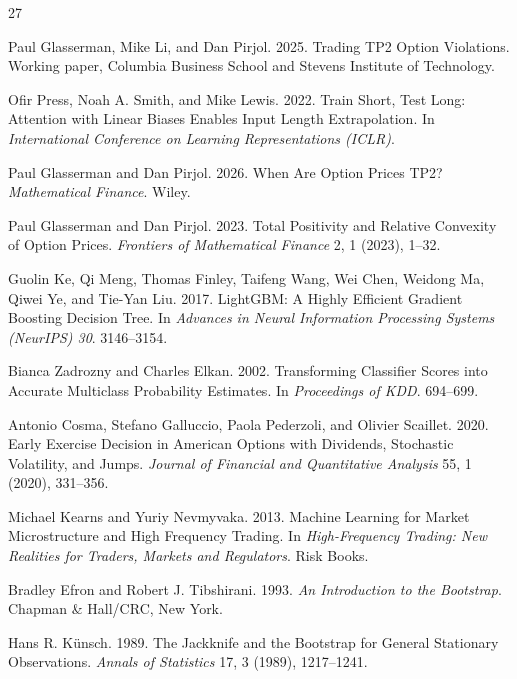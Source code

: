 \documentclass[sigconf,review]{acmart}
\begin{document}

\begingroup
\footnotesize
\setlength{\itemsep}{0pt}
\setlength{\parskip}{0pt}
\begin{thebibliography}{27}

Paul Glasserman, Mike Li, and Dan Pirjol. 2025. Trading TP2 Option Violations. Working paper, Columbia Business School and Stevens Institute of Technology.

Ofir Press, Noah A. Smith, and Mike Lewis. 2022. Train Short, Test Long: Attention with Linear Biases Enables Input Length Extrapolation. In \textit{International Conference on Learning Representations (ICLR)}.

Paul Glasserman and Dan Pirjol. 2026. When Are Option Prices TP2? \textit{Mathematical Finance}. Wiley.

Paul Glasserman and Dan Pirjol. 2023. Total Positivity and Relative Convexity of Option Prices. \textit{Frontiers of Mathematical Finance} 2, 1 (2023), 1--32.

Guolin Ke, Qi Meng, Thomas Finley, Taifeng Wang, Wei Chen, Weidong Ma, Qiwei Ye, and Tie-Yan Liu. 2017. LightGBM: A Highly Efficient Gradient Boosting Decision Tree. In \textit{Advances in Neural Information Processing Systems (NeurIPS) 30}. 3146--3154.

Bianca Zadrozny and Charles Elkan. 2002. Transforming Classifier Scores into Accurate Multiclass Probability Estimates. In \textit{Proceedings of KDD}. 694--699.

Antonio Cosma, Stefano Galluccio, Paola Pederzoli, and Olivier Scaillet. 2020. Early Exercise Decision in American Options with Dividends, Stochastic Volatility, and Jumps. \textit{Journal of Financial and Quantitative Analysis} 55, 1 (2020), 331--356.

Michael Kearns and Yuriy Nevmyvaka. 2013. Machine Learning for Market Microstructure and High Frequency Trading. In \textit{High-Frequency Trading: New Realities for Traders, Markets and Regulators}. Risk Books.

Bradley Efron and Robert J. Tibshirani. 1993. \textit{An Introduction to the Bootstrap}. Chapman \& Hall/CRC, New York.

Hans R. K\"unsch. 1989. The Jackknife and the Bootstrap for General Stationary Observations. \textit{Annals of Statistics} 17, 3 (1989), 1217--1241.


\end{thebibliography}
\end{document}
